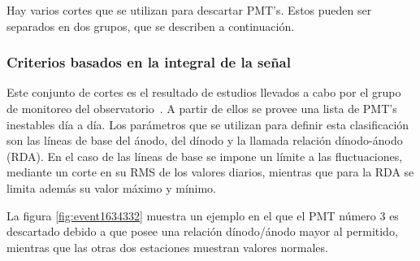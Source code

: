 	Hay varios cortes que se utilizan para descartar PMT's. 
	Estos pueden ser separados en dos grupos, que se describen a continuación.
	
		\subsubsection{Criterios basados en la integral de la señal}
		
		Este conjunto de cortes es el resultado de estudios llevados a cabo por el grupo de monitoreo del observatorio~\cite{pmtsAuger}. 
		A partir de ellos se provee una lista de PMT's inestables día a día.
		Los parámetros que se utilizan para definir esta clasificación son las líneas de base del ánodo, del dínodo y la llamada relación dínodo-ánodo (RDA).
		En el caso de las líneas de base se impone un l\'imite a las fluctuaciones, mediante un corte en su RMS de los valores diarios, mientras que para la RDA se limita adem\'as su valor máximo y mínimo.
		
		La figura \ref{fig:event1634332} muestra un ejemplo en el que el PMT número 3 es descartado debido a que posee una relación dínodo/ánodo mayor al permitido, mientras que las otras dos estaciones muestran valores normales.
		
